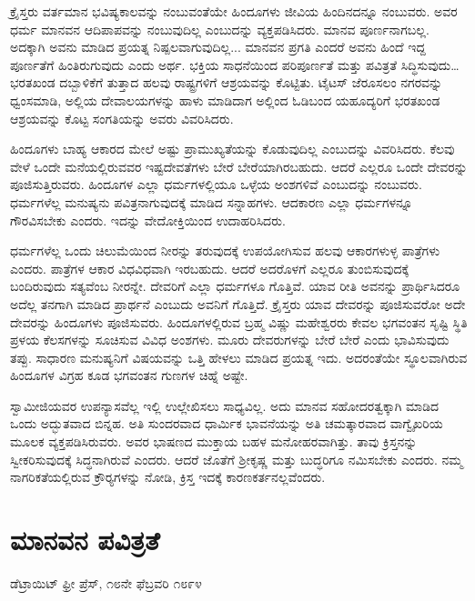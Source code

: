  ಕ್ರೈಸ್ತರು ವರ್ತಮಾನ ಭವಿಷ್ಯಕಾಲವನ್ನು ನಂಬುವಂತೆಯೇ ಹಿಂದೂಗಳು ಜೀವಿಯ ಹಿಂದಿನದನ್ನೂ ನಂಬುವರು. ಅವರ ಧರ್ಮ ಮಾನವನ ಆದಿಪಾಪವನ್ನು ನಂಬುವುದಿಲ್ಲ ಎಂಬುದನ್ನು ವ್ಯಕ್ತಪಡಿಸಿದರು. ಮಾನವ ಪೂರ್ಣನಾಗಬಲ್ಲ. ಅದಕ್ಕಾಗಿ ಅವನು ಮಾಡಿದ ಪ್ರಯತ್ನ ನಿಷ್ಪಲವಾಗುವುದಿಲ್ಲ... ಮಾನವನ ಪ್ರಗತಿ ಎಂದರೆ ಅವನು ಹಿಂದೆ ಇದ್ದ ಪೂರ್ಣತೆಗೆ ಹಿಂತಿರುಗುವುದು ಎಂದು ಅರ್ಥ. ಭಕ್ತಿಯ ಸಾಧನೆಯಿಂದ ಪರಿಪೂರ್ಣತೆ ಮತ್ತು ಪವಿತ್ರತೆ ಸಿದ್ಧಿಸುವುದು… ಭರತಖಂಡ ದಬ್ಬಾಳಿಕೆಗೆ ತುತ್ತಾದ ಹಲವು ರಾಷ್ಟ್ರಗಳಿಗೆ ಆಶ್ರಯವನ್ನು ಕೊಟ್ಟಿತು. ಟೈಟಸ್ ಜೆರೂಸಲಂ ನಗರವನ್ನು ಧ್ವಂಸಮಾಡಿ, ಅಲ್ಲಿಯ ದೇವಾಲಯಗಳನ್ನು ಹಾಳು ಮಾಡಿದಾಗ ಅಲ್ಲಿಂದ ಓಡಿಬಂದ ಯಹೂದ್ಯರಿಗೆ ಭರತಖಂಡ ಆಶ್ರಯವನ್ನು ಕೊಟ್ಟ ಸಂಗತಿಯನ್ನು ಅವರು ವಿವರಿಸಿದರು. 

 ಹಿಂದೂಗಳು ಬಾಹ್ಯ ಆಕಾರದ ಮೇಲೆ ಅಷ್ಟು ಪ್ರಾಮುಖ್ಯತೆಯನ್ನು ಕೊಡುವುದಿಲ್ಲ ಎಂಬುದನ್ನು ವಿವರಿಸಿದರು. ಕೆಲವು ವೇಳೆ ಒಂದೇ ಮನೆಯಲ್ಲಿರುವವರ ಇಷ್ಟದೇವತೆಗಳು ಬೇರೆ ಬೇರೆಯಾಗಿರಬಹುದು. ಆದರೆ ಎಲ್ಲರೂ ಒಂದೇ ದೇವರನ್ನು ಪೂಜಿಸುತ್ತಿರುವರು. ಹಿಂದೂಗಳ ಎಲ್ಲಾ ಧರ್ಮಗಳಲ್ಲಿಯೂ ಒಳ್ಳೆಯ ಅಂಶಗಳಿವೆ ಎಂಬುದನ್ನು ನಂಬುವರು. ಧರ್ಮಗಳೆಲ್ಲ ಮನುಷ್ಯನು ಪವಿತ್ರನಾಗುವುದಕ್ಕೆ ಮಾಡಿದ ಸನ್ನಾಹಗಳು. ಆದಕಾರಣ ಎಲ್ಲಾ ಧರ್ಮಗಳನ್ನೂ ಗೌರವಿಸಬೇಕು ಎಂದರು. ಇದನ್ನು ವೇದೋಕ್ತಿಯಿಂದ ಉದಾಹರಿಸಿದರು. 

 ಧರ್ಮಗಳೆಲ್ಲ ಒಂದು ಚಿಲುಮೆಯಿಂದ ನೀರನ್ನು ತರುವುದಕ್ಕೆ ಉಪಯೋಗಿಸುವ ಹಲವು ಆಕಾರಗಳುಳ್ಳ ಪಾತ್ರೆಗಳು ಎಂದರು. ಪಾತ್ರೆಗಳ ಆಕಾರ ವಿಧವಿಧವಾಗಿ ಇರಬಹುದು. ಆದರೆ ಅದರೊಳಗೆ ಎಲ್ಲರೂ ತುಂಬಿಸುವುದಕ್ಕೆ ಬಂದಿರುವುದು ಸತ್ಯವೆಂಬ ನೀರನ್ನೇ. ದೇವರಿಗೆ ಎಲ್ಲಾ ಧರ್ಮಗಳೂ ಗೊತ್ತಿವೆ. ಯಾವ ರೀತಿ ಅವನನ್ನು ಪ್ರಾರ್ಥಿಸಿದರೂ ಅದೆಲ್ಲ ತನಗಾಗಿ ಮಾಡಿದ ಪ್ರಾರ್ಥನೆ ಎಂಬುದು ಅವನಿಗೆ ಗೊತ್ತಿದೆ. ಕ್ರೈಸ್ತರು ಯಾವ ದೇವರನ್ನು ಪೂಜಿಸುವರೋ ಅದೇ ದೇವರನ್ನು ಹಿಂದೂಗಳು ಪೂಜಿಸುವರು. ಹಿಂದೂಗಳಲ್ಲಿರುವ ಬ್ರಹ್ಮ ವಿಷ್ಣು ಮಹೇಶ್ವರರು ಕೇವಲ ಭಗವಂತನ ಸೃಷ್ಟಿ ಸ್ಥಿತಿ ಪ್ರಳಯ ಕೆಲಸಗಳನ್ನು ಸೂಚಿಸುವ ವಿವಿಧ ಅಂಶಗಳು. ಮೂರು ದೇವರುಗಳನ್ನು ಬೇರೆ ಬೇರೆ ಎಂದು ಭಾವಿಸುವುದು ತಪ್ಪು. ಸಾಧಾರಣ ಮನುಷ್ಯನಿಗೆ ವಿಷಯವನ್ನು ಒತ್ತಿ ಹೇಳಲು ಮಾಡಿದ ಪ್ರಯತ್ನ ಇದು. ಅದರಂತೆಯೇ ಸ್ಥೂಲವಾಗಿರುವ ಹಿಂದೂಗಳ ವಿಗ್ರಹ ಕೂಡ ಭಗವಂತನ ಗುಣಗಳ ಚಿಹ್ನೆ ಅಷ್ಟೇ. 

 ಸ್ವಾಮೀಜಿಯವರ ಉಪನ್ಯಾಸವೆಲ್ಲ ಇಲ್ಲಿ ಉಲ್ಲೇಖಿಸಲು ಸಾಧ್ಯವಿಲ್ಲ. ಅದು ಮಾನವ ಸಹೋದರತ್ವಕ್ಕಾಗಿ ಮಾಡಿದ ಒಂದು ಅದ್ಭುತವಾದ ಬಿನ್ನಹ. ಅತಿ ಸುಂದರವಾದ ಧಾರ್ಮಿಕ ಭಾವನೆಯನ್ನು ಅತಿ ಚಮತ್ಕಾರವಾದ ವಾಗ್ವೈಖರಿಯ ಮೂಲಕ ವ್ಯಕ್ತಪಡಿಸಿರುವರು. ಅವರ ಭಾಷಣದ ಮುಕ್ತಾಯ ಬಹಳ ಮನೋಹರವಾಗಿತ್ತು. ತಾವು ಕ್ರಿಸ್ತನನ್ನು ಸ್ವೀಕರಿಸುವುದಕ್ಕೆ ಸಿದ್ಧನಾಗಿರುವೆ ಎಂದರು. ಆದರೆ ಜೊತೆಗೆ ಶ‍್ರೀಕೃಷ್ಣ ಮತ್ತು ಬುದ್ಧರಿಗೂ ನಮಿಸಬೇಕು ಎಂದರು. ನಮ್ಮ ನಾಗರಿಕತೆಯಲ್ಲಿರುವ ಕ್ರೌರ‍್ಯಗಳನ್ನು ನೋಡಿ, ಕ್ರಿಸ್ತ ಇದಕ್ಕೆ ಕಾರಣಕರ್ತನಲ್ಲವೆಂದರು.


\section*{ಮಾನವನ ಪವಿತ್ರತೆ }

\begin{flushright}
ಡೆಟ್ರಾಯಿಟ್ ಫ್ರೀ ಪ್ರೆಸ್, ೧೮ನೇ ಫೆಬ್ರವರಿ ೧೮೯೪ 
\end{flushright}

